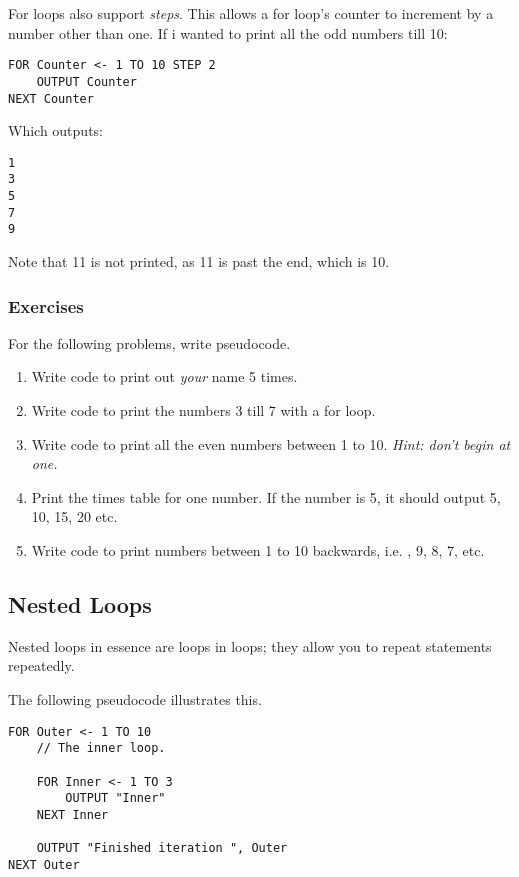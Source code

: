 \documentclass[./main.tex]{subfiles}
\begin{document}
For loops also support \emph{steps}. This allows a for loop's counter to increment by a number other than one. If i wanted to print all the odd numbers till 10:

\begin{verbatim}
FOR Counter <- 1 TO 10 STEP 2
    OUTPUT Counter
NEXT Counter
\end{verbatim}

Which outputs:

\begin{verbatim}
1
3
5
7
9
\end{verbatim}

Note that 11 is not printed, as 11 is past the end, which is 10.

\subsubsection{Exercises}
\label{ex:2_1_1}

For the following problems, write pseudocode.

\begin{enumerate}
    \item Write code to print out \emph{your} name 5 times.
        \mediumlines

    \item Write code to print the numbers 3 till 7 with a for loop.
        \mediumlines

    \item Write code to print all the even numbers between 1 to 10. \emph{Hint: don't begin at one.}
        \mediumlines

    \item Print the times table for one number. If the number is 5, it should output 5, 10, 15, 20 etc.
        \mediumlines

    \item Write code to print numbers between 1 to 10 backwards, i.e. {, 9, 8, 7, } etc.
        \mediumlines
\end{enumerate}

\subsection{Nested Loops}

Nested loops in essence are loops in loops; they allow you to repeat statements repeatedly.

The following pseudocode illustrates this.

\begin{verbatim}
FOR Outer <- 1 TO 10
    // The inner loop.

    FOR Inner <- 1 TO 3
        OUTPUT "Inner"
    NEXT Inner

    OUTPUT "Finished iteration ", Outer
NEXT Outer
\end{verbatim}
\end{document}
